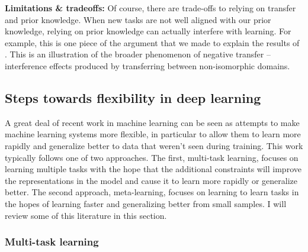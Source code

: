 \documentclass[11pt]{article}
\begin{document}
\textbf{Limitations \& tradeoffs:} Of course, there are trade-offs to relying on transfer and prior knowledge. When new tasks are not well aligned with our prior knowledge, relying on prior knowledge can actually interfere with learning. For example, this is one piece of the argument that we made \citep{Lampinen2017b} to explain the results of \citet{Kaminski2008}. This is an illustration of the broader phenomenon of negative transfer -- interference effects produced by transferring between non-isomorphic domains. \par


\subsection{Steps towards flexibility in deep learning}

A great deal of recent work in machine learning can be seen as attempts to make machine learning systems more flexible, in particular to allow them to learn more rapidly and generalize better to data that weren't seen during training. This work typically follows one of two approaches. The first, multi-task learning, focuses on learning multiple tasks with the hope that the additional constraints will improve the representations in the model and cause it to learn more rapidly or generalize better. The second approach, meta-learning, focuses on learning to learn tasks in the hopes of learning faster and generalizing better from small samples. I will review some of this literature in this section.

\subsubsection{Multi-task learning}
\end{document}
